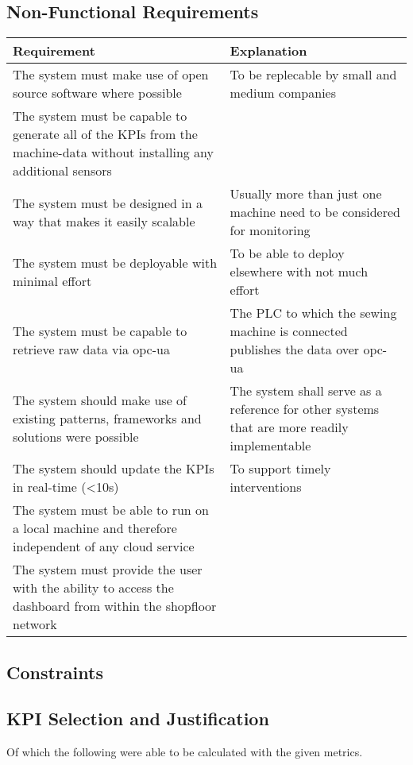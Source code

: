 \subsection{Non-Functional Requirements} %
\begin{tabularx}{\textwidth}{|X|X|}
	\hline
\textbf{Requirement}	&  \textbf{Explanation}\\
	\hline
The system must make use of open source software where possible	&  To be replecable by small and medium companies\\
	\hline
The system must be capable to generate all of the KPIs from the machine-data without installing any additional sensors	&  \\
	\hline
The system must be designed in a way that makes it easily scalable	&  Usually more than just one machine need to be considered for monitoring\\
	\hline
The system must be deployable with minimal effort	&  To be able to deploy elsewhere with not much effort \\
	\hline
The system must be capable to retrieve raw data via opc-ua	&  The PLC to which the sewing machine is connected publishes the data over opc-ua\\
	\hline
The system should make use of existing patterns, frameworks and solutions were possible	&  The system shall serve as a reference for other systems that are more readily implementable\\
	\hline
The system should update the KPIs in real-time (<10s)	&  To support timely interventions\\
	\hline
 The system must be able to run on a local machine and therefore independent of any cloud service	&  \\
	\hline
The system must provide the user with the ability to access the dashboard from within the shopfloor network	&  \\
	\hline
\end{tabularx}

\subsection{Constraints} %
\subsection{KPI Selection and Justification}
 Of which the following were able to be calculated with the given metrics.
\\